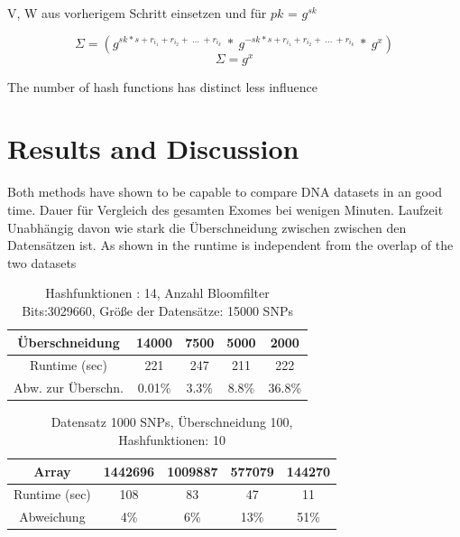 \documentclass[10pt,a4paper,oneside,twocolumn]{article}
\begin{document}
		 V, W aus vorherigem Schritt einsetzen und für $pk$ = $g^{sk}$ 
		
		\vskip 0.1cm 
		
		$$\Sigma = (g^{sk * s + r_{i_{1}} + r_{i_{2}} + \ ...\ +r_{i_{k}}} \ * \ g^{-sk * s + r_{i_{1}} + r_{i_{2}} + \ ...\ +r_{i_{k}}} \ * \ g^x) $$
		$$\Sigma = g^x$$




The number of hash functions has distinct less influence 
\section{Results and Discussion}

Both methods have shown to be capable to compare DNA datasets in an good time.
Dauer für Vergleich des gesamten Exomes bei wenigen Minuten.
Laufzeit Unabhängig davon wie stark die Überschneidung zwischen zwischen den Datensätzen ist. 
As shown in \cite{tab:meinetabelle1} the runtime is independent from the overlap of the two datasets 
	
	\begin{table}[h]
		\begin{tabular}{c|c|c|c|c}
			Überschneidung&14000&7500&5000&2000\\
			\hline
			Runtime (sec)& 221&247&211&222\\
			Abw. zur Überschn.& 0.01\%& 3.3\%&8.8\%&36.8\%\\
			
		\end{tabular}
		\caption{Hashfunktionen : 14, Anzahl Bloomfilter Bits:3029660, Größe der Datensätze: 15000 SNPs }
		\label{tab:meinetabelle1}
		
		
	\end{table}
	

	\begin{table}[h]
		
		\begin{tabular}{c|c|c|c|c}
			Array& 1442696&1009887&577079&144270\\
			\hline
			Runtime (sec)& 108&83&47&11\\
			Abweichung&4\%&6\%&13\%&51\%\\
			
			
		\end{tabular}
		\caption{Datensatz 1000 SNPs, Überschneidung 100, Hashfunktionen: 10 }
		\label{tab:meinetabelle2}
	\end{table}
	
\end{document}

